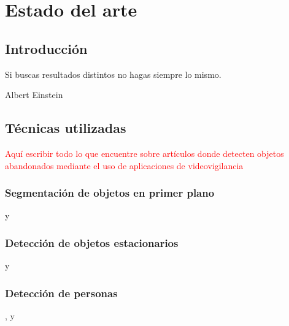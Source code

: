 
\chapter{Estado del arte}
\label{cha:estado-del-arte}

\section{Introducción}
\label{sec:intro-sota}

\begin{FraseCelebre}
  \begin{Frase}
    Si buscas resultados distintos no hagas siempre lo mismo.
  \end{Frase}
  \begin{Fuente}
    Albert Einstein
  \end{Fuente}
\end{FraseCelebre}

\section{Técnicas utilizadas}
\label{sec:tecnicas-utilizadas}

\textcolor{red}{Aquí escribir todo lo que encuentre sobre artículos donde detecten objetos abandonados mediante el uso de aplicaciones de videovigilancia}

\subsection{Segmentación de objetos en primer plano}
\label{subsec:tecnicas-segmentacion-obj-primer-plano}

\cite{BOUWMANS201431} y \cite{YAZDI2018157}

\newpage

\subsection{Detección de objetos estacionarios}
\label{subsec:tecnicas-deteccion-obj-estacionarios}

\cite{5279450} y \cite{CUEVAS201641}

\newpage

\subsection{Detección de personas}
\label{subsec:tecnicas-deteccion-personas}

\cite{4657363}, y \cite{https://doi.org/10.1049/iet-cvi.2014.0148}

